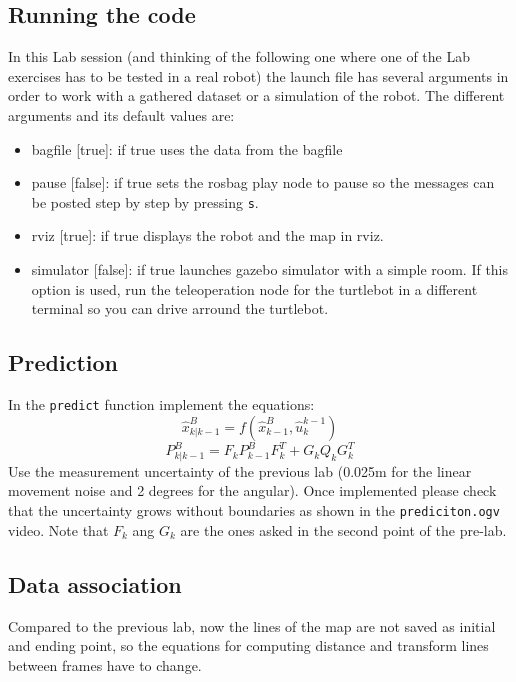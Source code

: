 \documentclass[a4paper,10pt]{article}
\begin{document}
\subsection{Running the code}
In this Lab session (and thinking of the following one where one of the Lab exercises has to be tested in a real robot) the launch file has several arguments in order to work with a gathered dataset or a simulation of the robot. The different arguments and its default values are:
\begin{itemize}
	\item bagfile [true]: if true uses the data from the bagfile
	\item pause [false]: if true sets the rosbag play node to pause so the messages can be posted step by step by pressing \texttt{s}.
	\item rviz [true]: if true displays the robot and the map in rviz.
	\item simulator [false]: if true launches gazebo simulator with a simple room. If this option is used, run the teleoperation node for the turtlebot in a different terminal so you can drive arround the turtlebot.
\end{itemize} 

\subsection{Prediction}
In the \texttt{predict} function implement the equations:
\begin{equation}
	\widehat{x}_{k|k-1}^B = f\left(\widehat{x}_{k-1}^B,\widehat{u}_k^{k-1} \right)
\end{equation}
\begin{equation}
	P_{k|k-1}^B = F_k P_{k-1}^B F_k^T + G_k Q_k G_k^T
\end{equation}
Use the measurement uncertainty of the previous lab (0.025m for the linear movement noise and 2 degrees for the angular). Once implemented please check that the uncertainty grows without boundaries as shown in the \texttt{prediciton.ogv} video. Note that $F_k$ ang $G_k$ are the ones asked in the second point of the pre-lab.

\subsection{Data association}
Compared to the previous lab, now the lines of the map are not saved as initial and ending point, so the equations for computing distance and transform lines between frames have to change.
\end{document}
